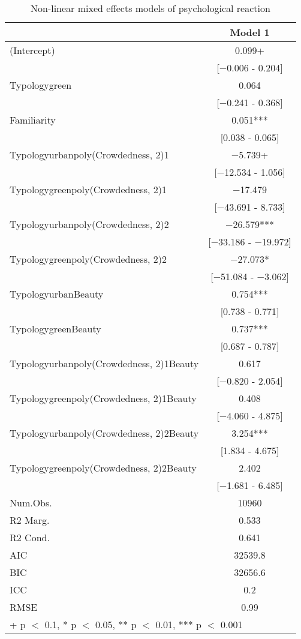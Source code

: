 \begin{table}

\caption{Non-linear mixed effects models of psychological reaction}
\centering
\begin{tabular}[t]{lc}
\toprule
  & Model 1\\
\midrule
(Intercept) & \num{0.099}+\\
 & {}[\num{-0.006} - \num{0.204}]\\
Typologygreen & \num{0.064}\\
 & {}[\num{-0.241} - \num{0.368}]\\
Familiarity & \num{0.051}***\\
 & {}[\num{0.038} - \num{0.065}]\\
Typologyurbanpoly(Crowdedness, 2)1 & \num{-5.739}+\\
 & {}[\num{-12.534} - \num{1.056}]\\
Typologygreenpoly(Crowdedness, 2)1 & \num{-17.479}\\
 & {}[\num{-43.691} - \num{8.733}]\\
Typologyurbanpoly(Crowdedness, 2)2 & \num{-26.579}***\\
 & {}[\num{-33.186} - \num{-19.972}]\\
Typologygreenpoly(Crowdedness, 2)2 & \num{-27.073}*\\
 & {}[\num{-51.084} - \num{-3.062}]\\
TypologyurbanBeauty & \num{0.754}***\\
 & {}[\num{0.738} - \num{0.771}]\\
TypologygreenBeauty & \num{0.737}***\\
 & {}[\num{0.687} - \num{0.787}]\\
Typologyurbanpoly(Crowdedness, 2)1Beauty & \num{0.617}\\
 & {}[\num{-0.820} - \num{2.054}]\\
Typologygreenpoly(Crowdedness, 2)1Beauty & \num{0.408}\\
 & {}[\num{-4.060} - \num{4.875}]\\
Typologyurbanpoly(Crowdedness, 2)2Beauty & \num{3.254}***\\
 & {}[\num{1.834} - \num{4.675}]\\
Typologygreenpoly(Crowdedness, 2)2Beauty & \num{2.402}\\
 & {}[\num{-1.681} - \num{6.485}]\\
\midrule
Num.Obs. & \num{10960}\\
R2 Marg. & \num{0.533}\\
R2 Cond. & \num{0.641}\\
AIC & \num{32539.8}\\
BIC & \num{32656.6}\\
ICC & \num{0.2}\\
RMSE & \num{0.99}\\
\bottomrule
\multicolumn{2}{l}{\rule{0pt}{1em}+ p $<$ 0.1, * p $<$ 0.05, ** p $<$ 0.01, *** p $<$ 0.001}\\
\end{tabular}
\end{table}
